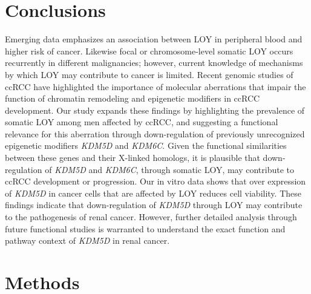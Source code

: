 \section{Conclusions}

Emerging data emphasizes an association between LOY in peripheral blood and higher risk of cancer\cite{Forsberg2014}.
Likewise focal or chromosome-level somatic LOY occurs recurrently in different malignancies; however, current knowledge of mechanisms by which LOY may contribute to cancer is limited.
Recent genomic studies of ccRCC have highlighted the importance of molecular aberrations that impair the function of chromatin remodeling and epigenetic modifiers in ccRCC development\cite{Carvalho2014,Rondinelli2015,Kakarougkas2014,Simon2014,Pfister2014,Riazalhosseini2016}.
Our study expands these findings by highlighting the prevalence of somatic LOY among men affected by ccRCC, and suggesting a functional relevance for this aberration through down-regulation of previously unrecognized epigenetic modifiers {\it KDM5D} and {\it KDM6C}.
Given the functional similarities between these genes and their X-linked homologs, it is plausible that down-regulation of {\it KDM5D} and {\it KDM6C}, through somatic LOY, may contribute to ccRCC development or progression.
Our {in vitro} data shows that over expression of {\it KDM5D} in cancer cells that are affected by LOY reduces cell viability.
These findings indicate that down-regulation of {\it KDM5D} through LOY may contribute to the pathogenesis of renal cancer.
However, further detailed analysis through future functional studies is warranted to understand the exact function and pathway context of {\it KDM5D} in renal cancer.

\section{Methods}
\label{sec:loymethods}

